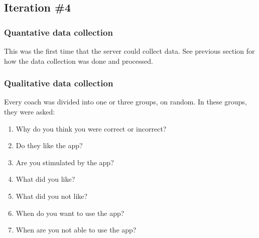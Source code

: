 \subsection{Iteration \#4}

\subsubsection{Quantative data collection}

This was the first time that the server could collect data. See previous section for how the data collection was done and processed.

\subsubsection{Qualitative data collection}
Every coach was divided into one or three groups, on random. In these groups, they were asked:

\begin{enumerate}
\item Why do you think you were correct or incorrect?
\item Do they like the app?
\item Are you stimulated by the app?
\item What did you like?
\item What did you not like?
\item When do you want to use the app?
\item When are you not able to use the app?
\end{enumerate}
